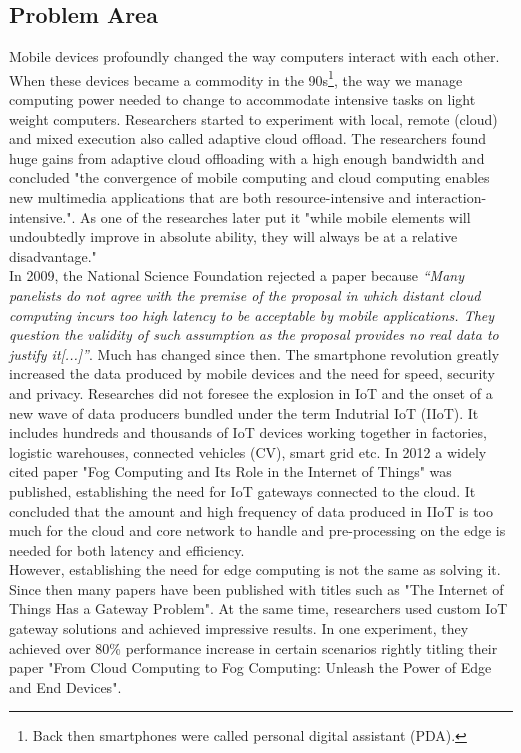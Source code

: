 \subsection{Problem Area}\label{sec:problemArea}
{
Mobile devices profoundly changed the way computers interact with each other. When these devices became a commodity in the 90s\footnote{Back then smartphones were called personal digital assistant (PDA).}, the way we manage computing power needed to change to accommodate intensive tasks on light weight computers. Researchers started to experiment with local, remote (cloud) and mixed execution also called adaptive cloud offload. The researchers found huge gains from adaptive cloud offloading with a high enough bandwidth and concluded "the convergence of mobile computing and cloud computing enables new multimedia applications that are both resource-intensive and interaction-intensive."\cite{noble1997agileIoTGatewayOdyssey}. As one of the researches later put it "while mobile elements will undoubtedly improve in absolute ability, they will always be at a relative disadvantage."\cite{satyanarayanan2015briefHistoryIoTGateway}\\
In 2009, the National Science Foundation rejected a paper because \textit{``Many panelists do not agree with the premise of the proposal in which distant cloud computing incurs too high latency to be acceptable by mobile applications. They question the validity of such assumption as the proposal provides no real data to justify it[...]''}\cite{satyanarayanan2015briefHistoryIoTGateway}. Much has changed since then. The smartphone revolution greatly increased the data produced by mobile devices and the need for speed, security and privacy. Researches did not foresee the explosion in IoT and the onset of a new wave of data producers bundled under the term Indutrial IoT (IIoT). It includes hundreds and thousands of IoT devices working together in factories, logistic warehouses, connected vehicles (CV), smart grid etc. In 2012 a widely cited paper "Fog Computing and Its Role in the Internet of Things"\cite{fogComputing:def} was published, establishing the need for IoT gateways connected to the cloud. It concluded that the amount and high frequency of data produced in IIoT is too much for the cloud and core network to handle and pre-processing on the edge is needed for both latency and efficiency.\\
However, establishing the need for edge computing is not the same as solving it. Since then many papers have been published with titles such as "The Internet of Things Has a Gateway Problem"\cite{zachariah2015internetOfThingsHasGatewayProblem}. At the same time, researchers used custom IoT gateway solutions and achieved impressive results. In one experiment, they achieved over 80\% performance increase in certain scenarios rightly titling their paper "From Cloud Computing to Fog Computing: Unleash the Power of Edge and End Devices"\cite{hong2017fromCloudtoIoTGatewayUnleashingTHePower}.\\
}
